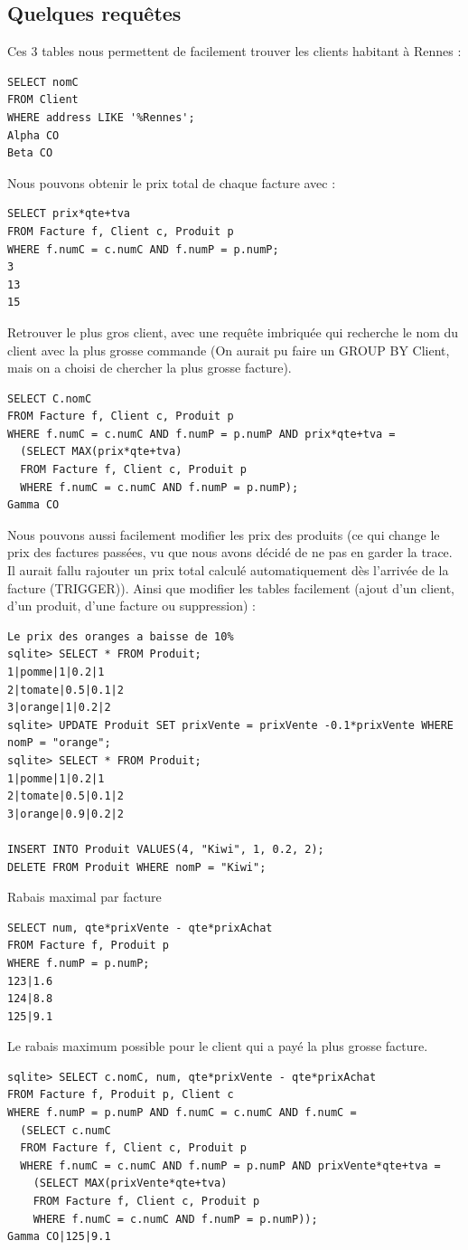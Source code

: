 \documentclass{article}
\begin{document}
\subsection{Quelques requ\^etes}
Ces 3 tables nous permettent de facilement trouver les clients habitant \`a Rennes :\\
\begin{verbatim}
SELECT nomC 
FROM Client 
WHERE address LIKE '%Rennes';
Alpha CO
Beta CO
\end{verbatim}
Nous pouvons obtenir le prix total de chaque facture avec :
\begin{verbatim}
SELECT prix*qte+tva 
FROM Facture f, Client c, Produit p 
WHERE f.numC = c.numC AND f.numP = p.numP;
3
13
15
\end{verbatim}
Retrouver le plus gros client, avec une requ\^ete imbriqu\'ee qui recherche le nom du client avec la plus grosse commande (On aurait pu faire un GROUP BY Client, mais on a choisi de chercher la plus grosse facture).
\begin{verbatim}
SELECT C.nomC 
FROM Facture f, Client c, Produit p 
WHERE f.numC = c.numC AND f.numP = p.numP AND prix*qte+tva = 
  (SELECT MAX(prix*qte+tva) 
  FROM Facture f, Client c, Produit p 
  WHERE f.numC = c.numC AND f.numP = p.numP);
Gamma CO
\end{verbatim}
Nous pouvons aussi facilement modifier les prix des produits (ce qui change le prix des factures pass\'ees, vu que nous avons d\'ecid\'e de ne pas en garder la trace. Il aurait fallu rajouter un prix total calcul\'e automatiquement d\`es l'arriv\'ee de la facture (TRIGGER)). Ainsi que modifier les tables facilement (ajout d'un client, d'un produit, d'une facture ou suppression) :
\begin{verbatim}
Le prix des oranges a baisse de 10%
sqlite> SELECT * FROM Produit;
1|pomme|1|0.2|1
2|tomate|0.5|0.1|2
3|orange|1|0.2|2
sqlite> UPDATE Produit SET prixVente = prixVente -0.1*prixVente WHERE 
nomP = "orange";
sqlite> SELECT * FROM Produit;
1|pomme|1|0.2|1
2|tomate|0.5|0.1|2
3|orange|0.9|0.2|2

INSERT INTO Produit VALUES(4, "Kiwi", 1, 0.2, 2);
DELETE FROM Produit WHERE nomP = "Kiwi";
\end{verbatim}
Rabais maximal par facture
\begin{verbatim}
SELECT num, qte*prixVente - qte*prixAchat 
FROM Facture f, Produit p 
WHERE f.numP = p.numP;
123|1.6
124|8.8
125|9.1
\end{verbatim}
Le rabais maximum possible pour le client qui a pay\'e la plus grosse facture.
\begin{verbatim}
sqlite> SELECT c.nomC, num, qte*prixVente - qte*prixAchat 
FROM Facture f, Produit p, Client c 
WHERE f.numP = p.numP AND f.numC = c.numC AND f.numC = 
  (SELECT c.numC 
  FROM Facture f, Client c, Produit p 
  WHERE f.numC = c.numC AND f.numP = p.numP AND prixVente*qte+tva = 
    (SELECT MAX(prixVente*qte+tva) 
    FROM Facture f, Client c, Produit p 
    WHERE f.numC = c.numC AND f.numP = p.numP));
Gamma CO|125|9.1
\end{verbatim}
\end{document}
